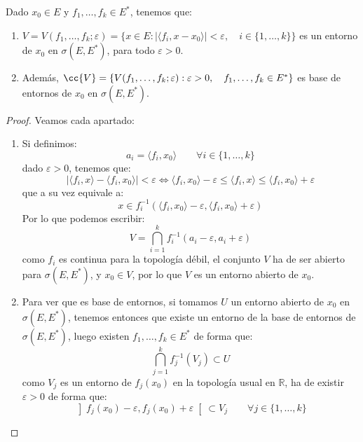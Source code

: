 \begin{prop}
    Dado $x_0\in E$ y $f_1, \ldots, f_k\in E^\ast$, tenemos que:
    \begin{enumerate}
        \item $V = V(f_1, \ldots, f_k;\varepsilon) = \{x\in E : |\langle f_i,x-x_0 \rangle | < \varepsilon, \quad i \in \{1,\ldots, k\}\}$ es un entorno de $x_0$ en $\sigma(E,E^\ast)$, para todo $\varepsilon>0$.
        \item Además, $\cc{V} = \{V(f_1, \ldots, f_k;\varepsilon) : \varepsilon>0, \quad f_1,\ldots,f_k\in E^\ast\}$ es base de entornos de $x_0$ en $\sigma(E,E^\ast)$.
    \end{enumerate}
    \begin{proof}
        Veamos cada apartado:
        \begin{enumerate}
            \item Si definimos:
                \begin{equation*}
                    a_i = \langle f_i ,x_0 \rangle  \qquad \forall i \in \{1,\ldots,k\}
                \end{equation*}
                dado $\varepsilon>0$, tenemos que:
                \begin{equation*}
                    |\langle f_i,x \rangle -\langle f_i,x_0 \rangle | < \varepsilon \Longleftrightarrow \langle f_i,x_0 \rangle -\varepsilon\leq \langle f_i,x \rangle \leq \langle f_i,x_0 \rangle  + \varepsilon
                \end{equation*}
                que a su vez equivale a:
                \begin{equation*}
                    x \in f_i^{-1}\left(\langle f_i,x_0 \rangle -\varepsilon,\langle f_i,x_0 \rangle +\varepsilon\right)
                \end{equation*}
                Por lo que podemos escribir:
                \begin{equation*}
                    V = \bigcap_{i = 1}^k f_i^{-1}(a_i - \varepsilon,a_i + \varepsilon)
                \end{equation*}
                como $f_i$ es continua para la topología débil, el conjunto $V$ ha de ser abierto para $\sigma(E,E^\ast)$, y $x_0\in V$, por lo que $V$ es un entorno abierto de $x_0$.
            \item Para ver que es base de entornos, si tomamos $U$ un entorno abierto de $x_0$ en $\sigma(E,E^\ast)$, tenemos entonces que existe un entorno de la base de entornos de $\sigma(E,E^\ast)$, luego existen $f_1, \ldots, f_k\in E^\ast$ de forma que:
                \begin{equation*}
                    \bigcap_{j=1}^k f_j^{-1}(V_j) \subset U
                \end{equation*}
                como $V_j$ es un entorno de $f_j(x_0)$ en la topología usual en $\mathbb{R}$, ha de existir $\varepsilon>0$ de forma que:
                \begin{equation*}
                    \left]f_j(x_0)-\varepsilon,f_j(x_0)+\varepsilon\right[\subset V_j \qquad \forall j \in \{1,\ldots,k\}
                \end{equation*}


\end{enumerate}
\end{proof}
\end{prop}

